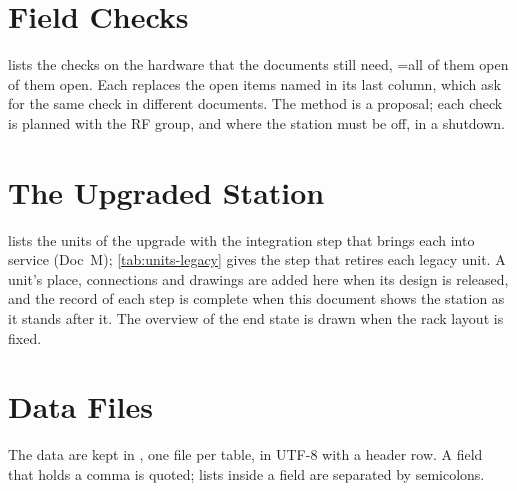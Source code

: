 \section{Field Checks}\label{sec:checks}

 lists the \WChecks{} checks on the hardware that the documents still
need, \ifnum\WChecksOpen=\WChecks\relax all of them open\else \WChecksOpen{} of them
open\fi. Each replaces the open items named in its last
column, which ask for the same check in different documents. The method is a
proposal; each check is planned with the RF group, and where the station must be off,
in a shutdown.



\section{The Upgraded Station}\label{sec:upgrade}

 lists the units of the upgrade with the integration step that
brings each into service (Doc~M); \cref{tab:units-legacy} gives the step that retires
each legacy unit. A unit's place, connections and drawings are added here when its
design is released, and the record of each step is complete when this document shows
the station as it stands after it. The overview of the end state is drawn when the
rack layout is fixed.



\appendix
\section{Data Files}\label{app:files}

The data are kept in , one file per table,
in UTF-8 with a header row. A field that holds a comma is quoted; lists inside a field
are separated by semicolons.

